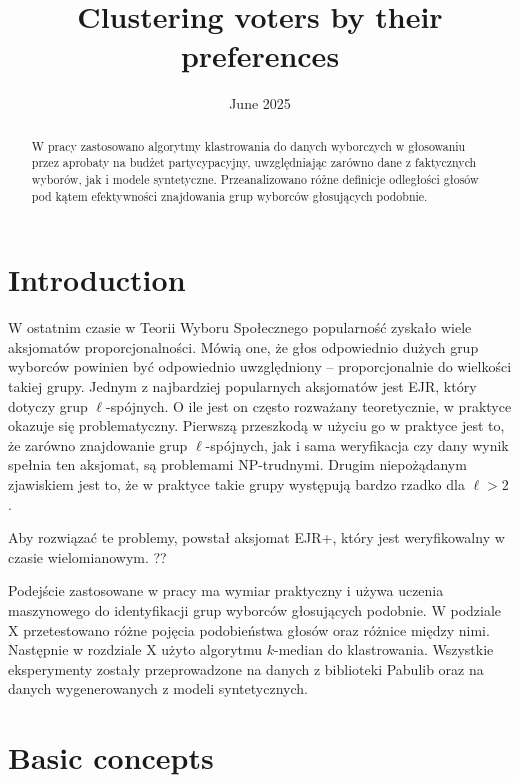 \documentclass[en]{pracamgr}
\title{Clustering voters by their preferences}
\date{June 2025}
\begin{document}
\maketitle

\begin{abstract}
W pracy zastosowano algorytmy klastrowania do danych wyborczych w głosowaniu
przez aprobaty na budżet partycypacyjny, uwzględniając zarówno dane z faktycznych
wyborów, jak i modele syntetyczne. Przeanalizowano różne definicje odległości
głosów pod kątem efektywności znajdowania grup wyborców głosujących podobnie.
\end{abstract}

\tableofcontents

\chapter*{Introduction}

W ostatnim czasie w Teorii Wyboru Społecznego popularność zyskało wiele
aksjomatów proporcjonalności. Mówią one, że głos odpowiednio dużych grup
wyborców powinien być odpowiednio uwzględniony -- proporcjonalnie do wielkości
takiej grupy. Jednym z najbardziej popularnych aksjomatów jest EJR, który
dotyczy grup $\ell$-spójnych. O ile jest on często rozważany teoretycznie, w
praktyce okazuje się problematyczny. Pierwszą przeszkodą w użyciu go
w praktyce jest to, że zarówno znajdowanie grup $\ell$-spójnych, jak i
sama weryfikacja czy dany wynik spełnia ten aksjomat, są problemami
NP-trudnymi. Drugim niepożądanym zjawiskiem jest to, że w praktyce takie grupy
występują bardzo rzadko dla $\ell > 2$.

Aby rozwiązać te problemy, powstał aksjomat EJR+, który jest weryfikowalny w
czasie wielomianowym. ??

Podejście zastosowane w pracy ma wymiar praktyczny i używa uczenia maszynowego
do identyfikacji grup wyborców głosujących podobnie. W podziale X przetestowano
różne pojęcia podobieństwa głosów oraz różnice między nimi. Następnie w
rozdziale X użyto algorytmu $k$-median do klastrowania. Wszystkie eksperymenty
zostały przeprowadzone na danych z biblioteki Pabulib oraz na danych
wygenerowanych z modeli syntetycznych.

\chapter{Basic concepts}\label{r:pojecia}
\end{document}
